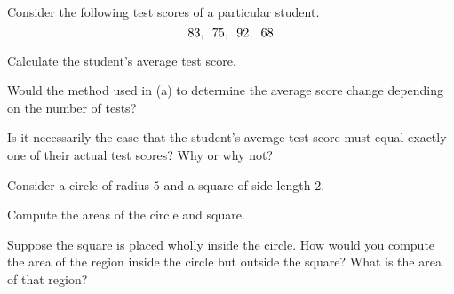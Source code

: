 \begin{pa} \label{PA:4.7}  Consider the following test scores of a particular student.
\[ 83, \enskip 75, \enskip 92, \enskip 68 \]

\ba
\item Calculate the student's average test score.
\item Would the method used in (a) to determine the average score change depending on the number of tests?
\item Is it necessarily the case that the student's average test score must equal exactly one of their actual test scores? Why or why not?
\ea

\noindent Consider a circle of radius $5$ and a square of side length $2$.

\ba
\item Compute the areas of the circle and square.
\item Suppose the square is placed wholly inside the circle.  How would you compute the area of the region inside the circle but outside the square?  What is the area of that region?
\ea
\end{pa} 
\afterpa